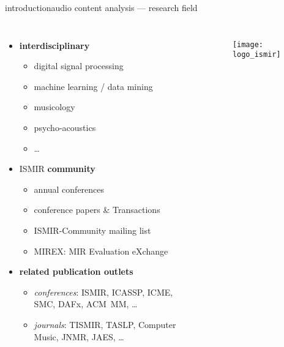         \begin{frame}{introduction}{audio content analysis --- research field}
            \vspace{-7mm}
            \begin{columns}
            \begin{itemize}
                \item<1->   \textbf{interdisciplinary}
                    \begin{itemize}
                        \item   digital signal processing
                        \item   machine learning / data mining
                        \item   musicology
                        \item   psycho-acoustics
                        \item   \ldots
                    \end{itemize}
                \smallskip
                \item<2->   ISMIR \textbf{community}
                            \begin{itemize}
                                \item   annual conferences
                                \item   conference papers \& Transactions
                                \item   ISMIR-Community mailing list
                                \item   MIREX: MIR Evaluation eXchange
                            \end{itemize}
                \smallskip
                \item<3->   \textbf{related publication outlets} 
                    \begin{itemize}
                        \item   \textit{conferences}: ISMIR, ICASSP, ICME, SMC, DAFx, ACM~MM, \ldots
                        \item   \textit{journals}: TISMIR, TASLP, Computer Music, JNMR, JAES, \ldots
                    \end{itemize}
            \end{itemize}
                \vspace{25mm}
                \begin{figure}
                    \texttt{[image: logo\_ismir]}
                \end{figure}
            \end{columns}
        \end{frame}
